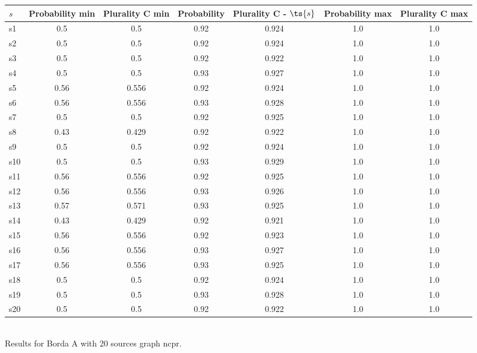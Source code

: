 \documentclass{article}
\begin{document}
\noindent\begin{tabular}{|l|c|c|c|c|c|c|}
\hline
$s$& Probability min & Plurality C min & Probability & Plurality C - $\ts{s}$ & Probability max & Plurality C max\\
\hline
s1 &0.5 & 0.5 & 0.92 & 0.924 & 1.0 & 1.0\\
\hline
s2 &0.5 & 0.5 & 0.92 & 0.924 & 1.0 & 1.0\\
\hline
s3 &0.5 & 0.5 & 0.92 & 0.922 & 1.0 & 1.0\\
\hline
s4 &0.5 & 0.5 & 0.93 & 0.927 & 1.0 & 1.0\\
\hline
s5 &0.56 & 0.556 & 0.92 & 0.924 & 1.0 & 1.0\\
\hline
s6 &0.56 & 0.556 & 0.93 & 0.928 & 1.0 & 1.0\\
\hline
s7 &0.5 & 0.5 & 0.92 & 0.925 & 1.0 & 1.0\\
\hline
s8 &0.43 & 0.429 & 0.92 & 0.922 & 1.0 & 1.0\\
\hline
s9 &0.5 & 0.5 & 0.92 & 0.924 & 1.0 & 1.0\\
\hline
s10 &0.5 & 0.5 & 0.93 & 0.929 & 1.0 & 1.0\\
\hline
s11 &0.56 & 0.556 & 0.92 & 0.925 & 1.0 & 1.0\\
\hline
s12 &0.56 & 0.556 & 0.93 & 0.926 & 1.0 & 1.0\\
\hline
s13 &0.57 & 0.571 & 0.93 & 0.925 & 1.0 & 1.0\\
\hline
s14 &0.43 & 0.429 & 0.92 & 0.921 & 1.0 & 1.0\\
\hline
s15 &0.56 & 0.556 & 0.92 & 0.923 & 1.0 & 1.0\\
\hline
s16 &0.56 & 0.556 & 0.93 & 0.927 & 1.0 & 1.0\\
\hline
s17 &0.56 & 0.556 & 0.93 & 0.925 & 1.0 & 1.0\\
\hline
s18 &0.5 & 0.5 & 0.92 & 0.924 & 1.0 & 1.0\\
\hline
s19 &0.5 & 0.5 & 0.93 & 0.928 & 1.0 & 1.0\\
\hline
s20 &0.5 & 0.5 & 0.92 & 0.922 & 1.0 & 1.0\\
\hline
\end{tabular}\\

\noindent Results for Borda A with 20 sources graph ncpr.
\end{document}
